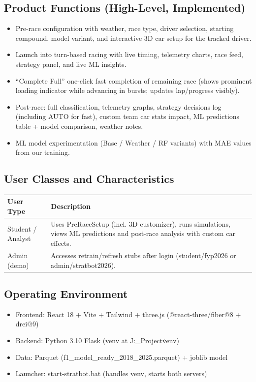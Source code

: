 \documentclass[12pt,a4paper]{article}
\begin{document}
\subsection{Product Functions (High-Level, Implemented)}
\begin{itemize}
\item Pre-race configuration with weather, race type, driver selection, starting compound, model variant, and interactive 3D car setup for the tracked driver.
\item Launch into turn-based racing with live timing, telemetry charts, race feed, strategy panel, and live ML insights.
\item ``Complete Full'' one-click fast completion of remaining race (shows prominent loading indicator while advancing in bursts; updates lap/progress visibly).
\item Post-race: full classification, telemetry graphs, strategy decisions log (including AUTO for fast), custom team car stats impact, ML predictions table + model comparison, weather notes.
\item ML model experimentation (Base / Weather / RF variants) with MAE values from our training.
\end{itemize}

\subsection{User Classes and Characteristics}
\begin{tabular}{|l|p{9cm}|}
\hline
\textbf{User Type} & \textbf{Description} \\
\hline
Student / Analyst & Uses PreRaceSetup (incl. 3D customizer), runs simulations, views ML predictions and post-race analysis with custom car effects. \\
\hline
Admin (demo) & Accesses retrain/refresh stubs after login (student/fyp2026 or admin/stratbot2026). \\
\hline
\end{tabular}

\subsection{Operating Environment}
\begin{itemize}
\item Frontend: React 18 + Vite + Tailwind + three.js (@react-three/fiber@8 + drei@9)
\item Backend: Python 3.10 Flask (venv at J:\FYP_Project\.venv)
\item Data: Parquet (f1\_model\_ready\_2018\_2025.parquet) + joblib model
\item Launcher: start-stratbot.bat (handles venv, starts both servers)
\end{itemize}
\end{document}
